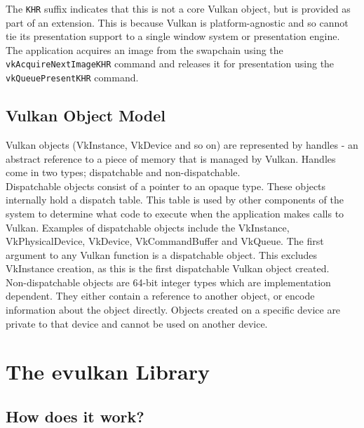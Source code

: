 \documentclass[12pt]{report}
\theoremstyle{definition}
\begin{document}
        The \texttt{KHR} suffix indicates that this is not a core Vulkan object,
        but is provided as part of an extension. This is because Vulkan is platform-agnostic
        and so cannot tie its presentation support to a single window system or presentation engine. \\

        The application acquires an image from the swapchain using the
        \texttt{vkAcquireNextImageKHR} command and releases it for presentation using the
        \texttt{vkQueuePresentKHR} command.

    \section{Vulkan Object Model}

      Vulkan objects (VkInstance, VkDevice and so on) are represented by
      handles - an abstract reference to a piece of memory that is managed by
      Vulkan. Handles come in two types; dispatchable and non-dispatchable. \\

      Dispatchable objects consist of a pointer to an opaque type. These
      objects internally hold a dispatch table. This table is used by other
      components of the system to determine what code to execute when the
      application makes calls to Vulkan. Examples of dispatchable objects
      include the VkInstance, VkPhysicalDevice, VkDevice, VkCommandBuffer
      and VkQueue. The first argument to any Vulkan function is a
      dispatchable object. This excludes VkInstance creation, as this
      is the first dispatchable Vulkan object created. \\

      Non-dispatchable objects are 64-bit integer types which are
      implementation dependent. They either contain a reference to another
      object, or encode information about the object directly. Objects
      created on a specific device are private to that device and cannot
      be used on another device.

  \chapter{The evulkan Library}

    \section{How does it work?}
\end{document}
